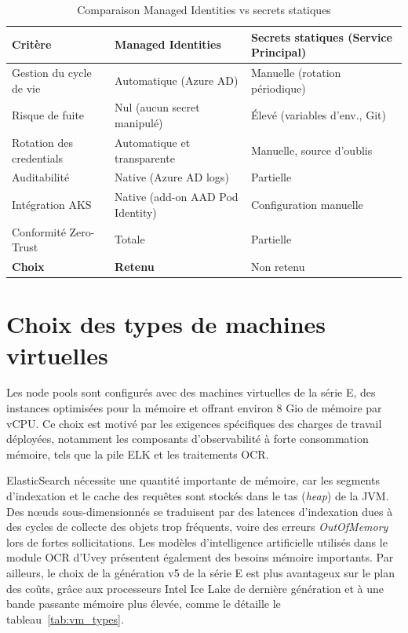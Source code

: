 \begin{table}[H]
  \centering
  \renewcommand{\arraystretch}{1.3}
  \begin{tabularx}{\textwidth}{L{4.5cm} L{4.5cm} L{4.5cm}}
    \toprule
    \textbf{Critère} & \textbf{Managed Identities} & \textbf{Secrets statiques (Service Principal)} \\
    \midrule
    Gestion du cycle de vie  & Automatique (Azure AD) & Manuelle (rotation périodique) \\
    Risque de fuite          & Nul (aucun secret manipulé) & Élevé (variables d'env., Git) \\
    Rotation des credentials & Automatique et transparente & Manuelle, source d'oublis \\
    Auditabilité             & Native (Azure AD logs) & Partielle \\
    Intégration AKS          & Native (add-on AAD Pod Identity) & Configuration manuelle \\
    Conformité Zero-Trust    & Totale & Partielle \\
    \textbf{Choix}           & \textbf{Retenu} & Non retenu \\
    \bottomrule
  \end{tabularx}
  \caption{Comparaison Managed Identities vs secrets statiques}
  \label{tab:managed_identities}
\end{table}

\section{Choix des types de machines virtuelles}
\label{sec:vm_types}

Les node pools sont configurés avec des machines virtuelles de la série E, des instances optimisées pour la mémoire et offrant environ 8 Gio de mémoire par vCPU. Ce choix est motivé par les exigences spécifiques des charges de travail déployées, notamment les composants d'observabilité à forte consommation mémoire, tels que la pile ELK et les traitements \ac{OCR}.

ElasticSearch nécessite une quantité importante de mémoire, car les segments d'indexation et le cache des requêtes sont stockés dans le tas (\textit{heap}) de la JVM. Des nœuds sous-dimensionnés se traduisent par des latences d'indexation dues à des cycles de collecte des objets trop fréquents, voire des erreurs \textit{OutOfMemory} lors de fortes sollicitations. Les modèles d'intelligence artificielle utilisés dans le module \ac{OCR} d'Uvey présentent également des besoins mémoire importants. Par ailleurs, le choix de la génération v5 de la série E est plus avantageux sur le plan des coûts, grâce aux processeurs Intel Ice Lake de dernière génération et à une bande passante mémoire plus élevée, comme le détaille le tableau~\ref{tab:vm_types}.

